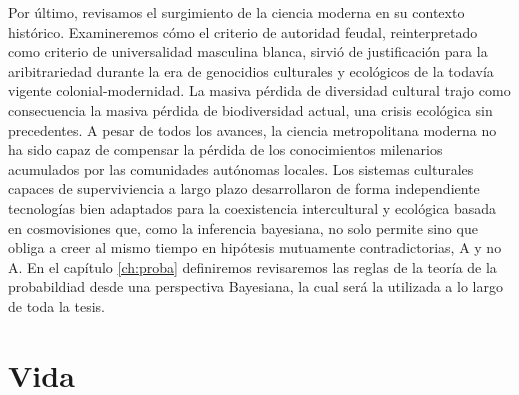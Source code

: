 \documentclass[a4paper,10pt]{book}
\theoremstyle{definition}
\begin{document}

Por último, revisamos el surgimiento de la ciencia moderna en su contexto histórico.
Examineremos cómo el criterio de autoridad feudal, reinterpretado como criterio de universalidad masculina blanca, sirvió de justificación para la aribitrariedad durante la era de genocidios culturales y ecológicos de la todavía vigente colonial-modernidad.
La masiva pérdida de diversidad cultural trajo como consecuencia la masiva pérdida de biodiversidad actual, una crisis ecológica sin precedentes.
A pesar de todos los avances, la ciencia metropolitana moderna no ha sido capaz de compensar la pérdida de los conocimientos milenarios acumulados por las comunidades autónomas locales.
Los sistemas culturales capaces de superviviencia a largo plazo desarrollaron de forma independiente tecnologías bien adaptados para la coexistencia intercultural y ecológica basada en cosmovisiones que, como la inferencia bayesiana, no solo permite sino que obliga a creer al mismo tiempo en hipótesis mutuamente contradictorias, A y no A.
En el capítulo \ref{ch:proba} definiremos revisaremos las reglas de la teoría de la probabildiad desde una perspectiva Bayesiana, la cual será la utilizada a lo largo de toda la tesis.

%  

\section{Vida}
\end{document}
